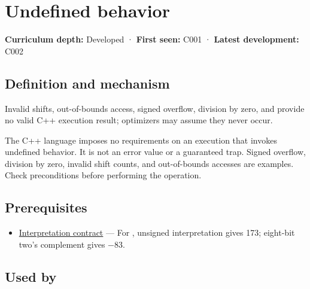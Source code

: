 \hypertarget{appendix-f558f5b4d8f2}{}\label{referencestart:appendix-f558f5b4d8f2}
\section{Undefined behavior}\label{appendix-f558f5b4d8f2-undefined-behavior}

\hypertarget{appendix-f558f5b4d8f2-undefined-behavior}{}

\textbf{Curriculum depth:} Developed · \textbf{First seen:} C001 · \textbf{Latest development:} C002

\begin{allmightroledefinition}

\subsection{Definition and mechanism}\label{appendix-f558f5b4d8f2-definition-and-mechanism}

\hypertarget{appendix-f558f5b4d8f2-definition-and-mechanism}{}

Invalid shifts, out-of-bounds access, signed overflow, division by zero, and  provide no valid C++ execution result; optimizers may assume they never occur.

\end{allmightroledefinition}

The C++ language imposes no requirements on an execution that invokes undefined behavior. It is not an error value or a guaranteed trap. Signed overflow, division by zero, invalid shift counts, and out-of-bounds accesses are examples. Check preconditions before performing the operation.

\subsection{Prerequisites}\label{appendix-f558f5b4d8f2-prerequisites}

\hypertarget{appendix-f558f5b4d8f2-prerequisites}{}

\begin{itemize}
\tightlist
\item
  \hyperref[appendix-f414bd4ed05c]{Interpretation contract} --- For , unsigned interpretation gives 173; eight-bit two's complement gives −83.
\end{itemize}

\subsection{Used by}\label{appendix-f558f5b4d8f2-used-by}

